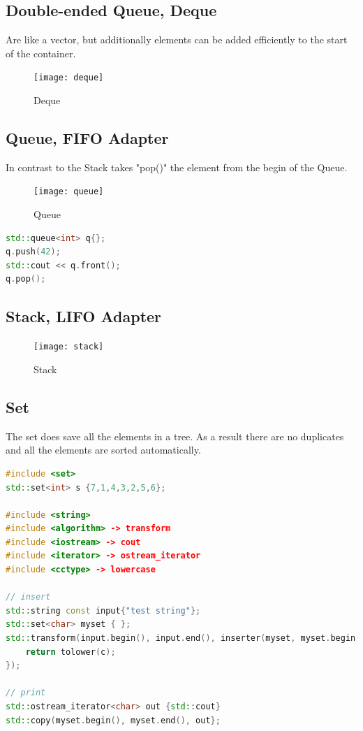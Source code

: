 \subsection{Double-ended Queue, Deque}
Are like a vector, but additionally elements can be added efficiently to the start of the container.
\begin{figure}[h!]
  \centering
  \texttt{[image: deque]}
  \caption{Deque}
\end{figure}

\subsection{Queue, FIFO Adapter}
In contrast to the Stack takes "pop()" the element from the begin of the Queue.
\begin{figure}[h!] 
  \centering
  \texttt{[image: queue]}
  \caption{Queue}
\end{figure}
\begin{lstlisting}[language=C++]
std::queue<int> q{};
q.push(42);
std::cout << q.front();
q.pop();
\end{lstlisting}


\subsection{Stack, LIFO Adapter}
\begin{figure}[h!]
  \centering
  \texttt{[image: stack]}
  \caption{Stack}
\end{figure}

\subsection{Set}
The set does save all the elements in a tree. As a result there are no duplicates and all the elements are sorted automatically.
\begin{lstlisting}[language=C++]
#include <set>
std::set<int> s {7,1,4,3,2,5,6};

#include <string>
#include <algorithm> -> transform
#include <iostream> -> cout
#include <iterator> -> ostream_iterator
#include <cctype> -> lowercase

// insert
std::string const input{"test string"};
std::set<char> myset { };
std::transform(input.begin(), input.end(), inserter(myset, myset.begin()), [](char c) {
	return tolower(c);
});

// print
std::ostream_iterator<char> out {std::cout}
std::copy(myset.begin(), myset.end(), out};

\end{lstlisting}

